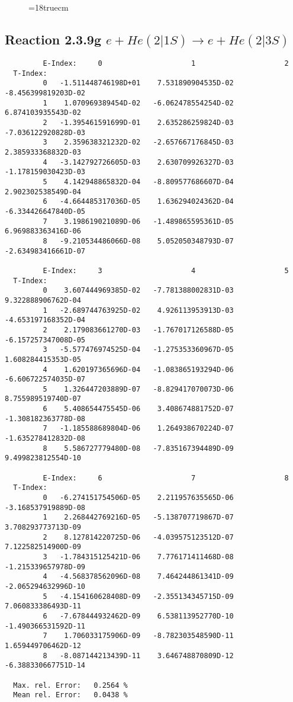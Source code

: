 \begin{figure} \label{2.3.9f}
\epsfxsize=18truecm
\end{figure}
\newpage

\subsection{
Reaction 2.3.9g $ e + He(2|1S) \rightarrow e + He(2|3S) $
}




\begin{verbatim}
         E-Index:     0                     1                     2
  T-Index:
         0   -1.511448746198D+01    7.531890904535D-02   -8.456399819203D-02
         1    1.070969389454D-02   -6.062478554254D-02    6.874103935543D-02
         2   -1.395461591699D-01    2.635286259824D-03   -7.036122920828D-03
         3    2.359638321232D-02   -2.657667176845D-03    2.385933368832D-03
         4   -3.142792726605D-03    2.630709926327D-03   -1.178159030423D-03
         5    4.142948865832D-04   -8.809577686607D-04    2.902302538549D-04
         6   -4.664485317036D-05    1.636294024362D-04   -6.334426647840D-05
         7    3.198619021089D-06   -1.489865595361D-05    6.969883363416D-06
         8   -9.210534486066D-08    5.052050348793D-07   -2.634983416661D-07

         E-Index:     3                     4                     5
  T-Index:
         0    3.607444969385D-02   -7.781388002831D-03    9.322888906762D-04
         1   -2.689744763925D-02    4.926113953913D-03   -4.653197168352D-04
         2    2.179083661270D-03   -1.767017126588D-05   -6.157257347008D-05
         3   -5.577476974525D-04   -1.275353360967D-05    1.608284415353D-05
         4    1.620197365696D-04   -1.083865193294D-06   -6.606722574035D-07
         5    1.326447203889D-07   -8.829417070073D-06    8.755989519740D-07
         6    5.408654475545D-06    3.408674881752D-07   -1.308182363778D-08
         7   -1.185588689804D-06    1.264938670224D-07   -1.635278412832D-08
         8    5.586727779480D-08   -7.835167394489D-09    9.499823812554D-10

         E-Index:     6                     7                     8
  T-Index:
         0   -6.274151754506D-05    2.211957635565D-06   -3.168537919889D-08
         1    2.268442769216D-05   -5.138707719867D-07    3.708293773713D-09
         2    8.127814220725D-06   -4.039575123512D-07    7.122582514900D-09
         3   -1.784315125421D-06    7.776171411468D-08   -1.215339657978D-09
         4   -4.568378562096D-08    7.464244861341D-09   -2.065294632996D-10
         5   -4.154160628408D-09   -2.355134345715D-09    7.060833386493D-11
         6   -7.678444932462D-09    6.538113952770D-10   -1.490366531592D-11
         7    1.706033175906D-09   -8.782303548590D-11    1.659449706462D-12
         8   -8.087144213439D-11    3.646748870809D-12   -6.388330667751D-14

  Max. rel. Error:   0.2564 %
  Mean rel. Error:   0.0438 %


\end{verbatim}

